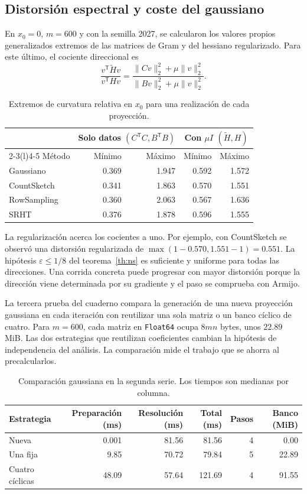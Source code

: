 \documentclass[11pt,a4paper]{article}
\newcommand{\T}{^{\mathsf T}}
\newcommand{\eps}{\varepsilon}
\newcommand{\nrm}[1]{\lVert #1\rVert}
\newcommand{\HS}{\widetilde H}
\begin{document}
\subsection{Distorsión espectral y coste del gaussiano}
En $x_0=0$, $m=600$ y con la semilla 2027, se calcularon los valores propios generalizados extremos de las matrices de Gram y del hessiano regularizado. Para este último, el cociente direccional es
\[
 \frac{v\T\HS v}{v\T Hv}=\frac{\nrm{Cv}_2^2+\mu\nrm v_2^2}{\nrm{Bv}_2^2+\mu\nrm v_2^2}.
\]
\begin{table}[htbp]\centering\small
\caption{Extremos de curvatura relativa en $x_0$ para una realización de cada proyección.}\label{tab:espectro}
\begin{tabular}{@{}lrrrr@{}}\toprule
& \multicolumn{2}{c}{Solo datos $(C\T C,B\T B)$}
& \multicolumn{2}{c}{Con $\mu I$ $(\HS,H)$}\\
\cmidrule(lr){2-3}\cmidrule(l){4-5}
Método & Mínimo & Máximo & Mínimo & Máximo\\ \midrule
Gaussiano & 0.369 & 1.947 & 0.592 & 1.572\\
CountSketch & 0.341 & 1.863 & 0.570 & 1.551\\
RowSampling & 0.360 & 2.063 & 0.567 & 1.636\\
SRHT & 0.376 & 1.878 & 0.596 & 1.555\\ \bottomrule
\end{tabular}
\end{table}

La regularización acerca los cocientes a uno. Por ejemplo, con CountSketch se observó una distorsión regularizada de $\max(1-0.570,1.551-1)=0.551$. La hipótesis $\eps\le1/8$ del teorema~\ref{th:ns} es suficiente y uniforme para todas las direcciones. Una corrida concreta puede progresar con mayor distorsión porque la dirección viene determinada por su gradiente y el paso se comprueba con Armijo.

La tercera prueba del cuaderno compara la generación de una nueva proyección gaussiana en cada iteración con reutilizar una sola matriz o un banco cíclico de cuatro. Para $m=600$, cada matriz en \texttt{Float64} ocupa $8mn$ bytes, unos $22.89$ MiB. Las dos estrategias que reutilizan coeficientes cambian la hipótesis de independencia del análisis. La comparación mide el trabajo que se ahorra al precalcularlos.
\begin{table}[htbp]\centering\small
\caption{Comparación gaussiana en la segunda serie. Los tiempos son medianas por columna.}\label{tab:banco}
\begin{tabular}{@{}lrrrrr@{}}\toprule
Estrategia & Preparación (ms) & Resolución (ms) & Total (ms) & Pasos & Banco (MiB)\\ \midrule
Nueva & 0.001 & 81.56 & 81.56 & 4 & 0.00\\
Una fija & 9.85 & 70.72 & 79.84 & 5 & 22.89\\
Cuatro cíclicas & 48.09 & 57.64 & 121.69 & 4 & 91.55\\ \bottomrule
\end{tabular}
\end{table}
\end{document}
